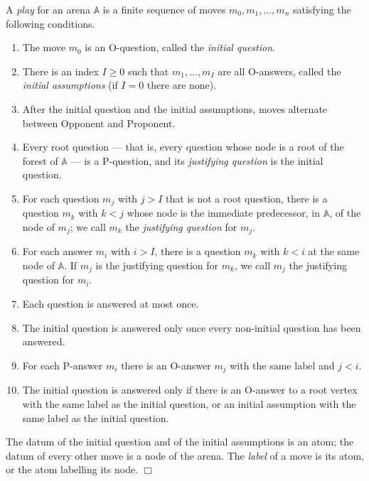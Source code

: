 \documentclass[10pt,a4paper]{amsart}
\newcommand{\arena}[1]{\mathbb{#1}}                     %
\newcommand{\fillBox}{\hfill$\Box$}
\begin{document}
\begin{definition}[Play]
\label{def:play}
A \emph{play} for an arena $\arena{A}$ is a finite sequence of moves $m_0, m_1, \ldots, m_n$ satisfying the following conditions.
    \begin{enumerate}[label=(\roman*)]
        \item The move $m_0$ is an O-question, called the \emph{initial question}.
        \item There is an index $I \ge 0$ such that $m_1, \ldots, m_I$ are all O-answers,
      called the \emph{initial assumptions} (if $I = 0$ there are none).
        \item After the initial question and the initial assumptions, moves alternate between Opponent and Proponent.
        \item Every root question --- that is, every question whose node is a root of the
      forest of $\arena{A}$ --- is a P-question, and its \emph{justifying question}
      is the initial question.
\item For each question $m_j$ with $j > I$ that is not a root question, there is a
      question $m_k$ with $k < j$ whose node is the immediate predecessor, in
      $\arena{A}$, of the node of $m_j$; we call $m_k$ the \emph{justifying
      question} for $m_j$.
        \item For each answer $m_i$ with $i > I$, there is a question $m_k$ with $k < i$ at the same node of $\arena{A}$. If $m_j$ is the justifying question for $m_k$, we call $m_j$ the justifying question for $m_i$.
        \item Each question is answered at most once.
        \item The initial question is answered only once every non-initial question has been answered.
        \item For each P-answer $m_i$ there is an O-answer $m_j$ with the same label and $j < i$.
        \item The initial question is answered only if there is an O-answer to a root vertex with the same label as the initial question, or an initial assumption with the same label as the initial question.
    \end{enumerate}
    The datum of the initial question and of the initial assumptions is an atom; the datum of every other move is a node of the arena. The \emph{label} of a move is
its atom, or the atom labelling its node. \fillBox
\end{definition}
\end{document}

